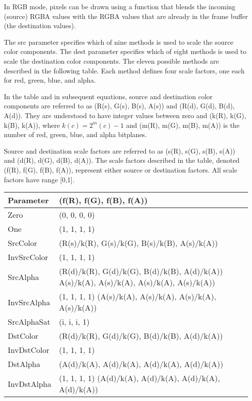 In RGB mode, pixels can be drawn using a function that blends the incoming (source)
RGBA values with the RGBA values that are already in the frame buffer (the destination values).

The src parameter specifies which of nine methods is used to scale the source color components.
The dest parameter specifies which of eight methods is used to scale the destination color
components. The eleven possible methods are described in the following table.
Each method defines four scale factors, one each for red, green, blue, and alpha.

In the table and in subsequent equations, source and destination color components are referred
to as (R(s), G(s), B(s), A(s)) and (R(d), G(d), B(d), A(d)). They are understood to
have integer values between zero and (k(R), k(G), k(B), k(A)), where
\(k (c) = 2^m (c) - 1\)
and (m(R), m(G), m(B), m(A)) is the number of red, green, blue, and alpha bitplanes.

Source and destination scale factors are referred to as (s(R), s(G), s(B), s(A)) and
(d(R), d(G), d(B), d(A)). The scale factors described in the table, denoted
(f(R), f(G), f(B), f(A)), represent either source or destination factors.
All scale factors have range [0,1].\\

\begin{tabular}{|p{4.5cm}|p{9cm}|}
\hline
\textbf{Parameter} & \textbf{(f(R), f(G), f(B), f(A))}\\
\hline
Zero        & (0, 0, 0, 0)\\
One         & (1, 1, 1, 1)\\
SrcColor    & (R(s)/k(R), G(s)/k(G), B(s)/k(B), A(s)/k(A))\\
InvSrcColor & (1, 1, 1, 1)\\
SrcAlpha    & (R(d)/k(R), G(d)/k(G), B(d)/k(B), A(d)/k(A))\newline
               A(s)/k(A), A(s)/k(A), A(s)/k(A), A(s)/k(A))\\
InvSrcAlpha & (1, 1, 1, 1)\newline
              (A(s)/k(A), A(s)/k(A), A(s)/k(A), A(s)/k(A))\\
SrcAlphaSat & (i, i, i, 1)\\
DstColor    & (R(d)/k(R), G(d)/k(G), B(d)/k(B), A(d)/k(A))\\
InvDstColor & (1, 1, 1, 1)\\
DstAlpha    & (A(d)/k(A), A(d)/k(A), A(d)/k(A), A(d)/k(A))\\
InvDstAlpha & (1, 1, 1, 1)\newline
              (A(d)/k(A), A(d)/k(A), A(d)/k(A), A(d)/k(A))\\
\hline
\end{tabular}

